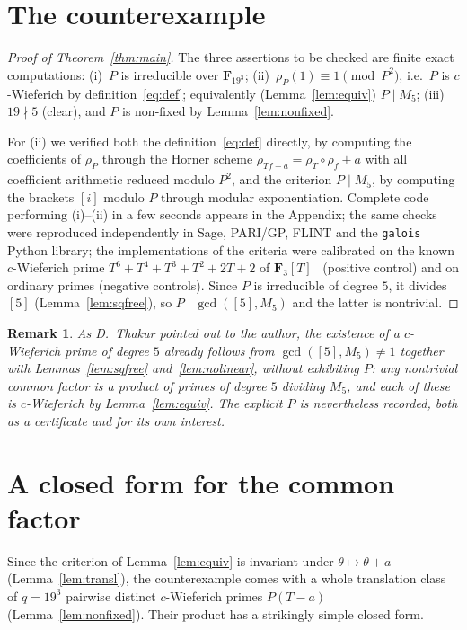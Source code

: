 \documentclass[10pt,a4paper]{amsart}
\newcommand{\F}{\mathbf{F}}
\newtheorem{remark}[theorem]{Remark}
\begin{document}
\section{The counterexample}

\begin{proof}[Proof of Theorem~\ref{thm:main}]
The three assertions to be checked are finite exact computations:
(i)~$P$ is irreducible over $\F_{19^3}$;
(ii)~$\rho_P(1)\equiv1\pmod{P^2}$, i.e.\ $P$ is $c$-Wieferich by
definition~\eqref{eq:def}; equivalently (Lemma~\ref{lem:equiv}) $P\mid M_5$;
(iii)~$19\nmid5$ (clear), and $P$ is non-fixed by Lemma~\ref{lem:nonfixed}.

For (ii) we verified both the definition~\eqref{eq:def} directly, by computing
the coefficients of $\rho_P$ through the Horner scheme
$\rho_{Tf+a}=\rho_T\circ\rho_f+a$ with all coefficient arithmetic reduced
modulo $P^2$, and the criterion $P\mid M_5$, by computing the brackets $[i]$
modulo $P$ through modular exponentiation. Complete code performing (i)--(ii) in
a few seconds appears in the Appendix; the same checks were reproduced
independently in Sage, PARI/GP, FLINT and the \texttt{galois} Python library;
the implementations of the criteria were calibrated on the known $c$-Wieferich
prime $T^6+T^4+T^3+T^2+2T+2$ of $\F_3[T]$~\cite{BB} (positive control) and on
ordinary primes (negative controls). Since $P$ is irreducible of degree $5$, it
divides $[5]$ (Lemma~\ref{lem:sqfree}), so $P\mid\gcd([5],M_5)$ and the latter
is nontrivial.
\end{proof}

\begin{remark}
As D.~Thakur pointed out to the author, the existence of a $c$-Wieferich prime
of degree $5$ already follows from $\gcd([5],M_5)\neq1$ together with
Lemmas~\ref{lem:sqfree} and~\ref{lem:nolinear}, without exhibiting $P$: any
nontrivial common factor is a product of primes of degree $5$ dividing $M_5$,
and each of these is $c$-Wieferich by Lemma~\ref{lem:equiv}. The explicit $P$ is
nevertheless recorded, both as a certificate and for its own interest.
\end{remark}

\section{A closed form for the common factor}

Since the criterion of Lemma~\ref{lem:equiv} is invariant under
$\theta\mapsto\theta+a$ (Lemma~\ref{lem:transl}), the counterexample comes with
a whole translation class of $q=19^3$ pairwise distinct $c$-Wieferich primes
$P(T-a)$ (Lemma~\ref{lem:nonfixed}). Their product has a strikingly simple
closed form.
\end{document}
